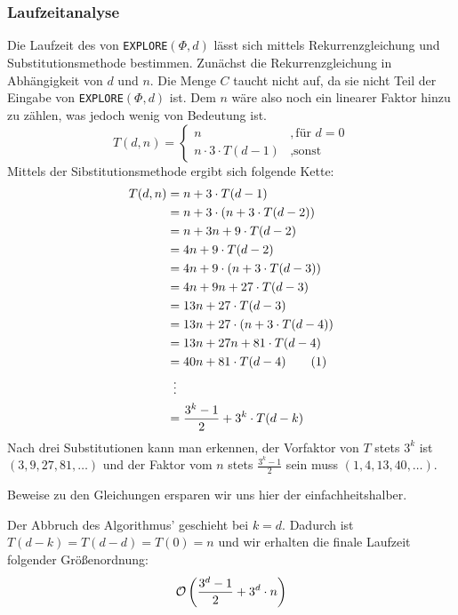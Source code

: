 \documentclass[a4paper]{article}
\newcommand{\explore}{\texttt{EXPLORE$(\Phi, d)$}\xspace}
\begin{document}
	\maketitle
	\section{}
	\section{}
	\subsubsection{}
	
	\subsubsection*{Laufzeitanalyse}
	Die Laufzeit des von \explore lässt sich mittels Rekurrenzgleichung und Substitutionsmethode bestimmen.\n
	Zunächst die Rekurrenzgleichung in Abhängigkeit von $d$ und $n$.
	Die Menge $C$ taucht nicht auf, da sie nicht Teil der Eingabe von \explore ist. Dem $n$ wäre also noch ein linearer Faktor hinzu zu zählen, was jedoch wenig von Bedeutung ist.
	\[
		T(d, n)=
		\begin{cases}
			n					& , \text{für } d=0\\
			n\cdot 3\cdot T(d-1)		& , \text{sonst}
		\end{cases}
	\]
	Mittels der Sibstitutionsmethode ergibt sich folgende Kette:
	\begin{align*}
		T(d, n)	&=		n+3		\cdot 						T(d-1)			\\
				&=		n+3		\cdot 	(	n+3		\cdot 	T(d-2))			\\
				&=		n+3			 		n+9		\cdot 	T(d-2)			\\
				&=	4 	n+9		\cdot 						T(d-2)			\\
				&=	4 	n+9		\cdot	(	n+3		\cdot 	T(d-3))			\\
				&=	4	n+9					n+27	\cdot	T(d-3)			\\
				&=	13	n+27	\cdot						T(d-3)			\\
				&=	13	n+27	\cdot	(	n+3		\cdot	T(d-4))			\\
				&=	13	n+27				n+81	\cdot	T(d-4)			\\
				&=	40	n+81	\cdot						T(d-4)	\tag{1}	\\
				&\makebox[\widthof{${}={}$}][c]{\vdots}					\\
				&=\frac{3^k-1}{2}+3^k\cdot T(d-k)
	\end{align*}
	Nach drei Substitutionen kann man erkennen, der Vorfaktor von $T$ stets $3^k$ ist $(3, 9, 27, 81, \dots)$ und der Faktor vom $n$ stets $\frac{3^k-1}{2}$ sein muss $(1, 4, 13, 40, \dots)$.
	\begin{note}
	Beweise zu den Gleichungen ersparen wir uns hier der einfachheitshalber.
	\end{note}
	Der Abbruch des Algorithmus' geschieht bei $k=d$.
	Dadurch ist $T(d-k)=T(d-d)=T(0)=n$ und wir erhalten die finale Laufzeit folgender Größenordnung:
	\[
		\mathcal{O}\left(\frac{3^d-1}{2}+3^d\cdot n\right)
	\]
\end{document}
